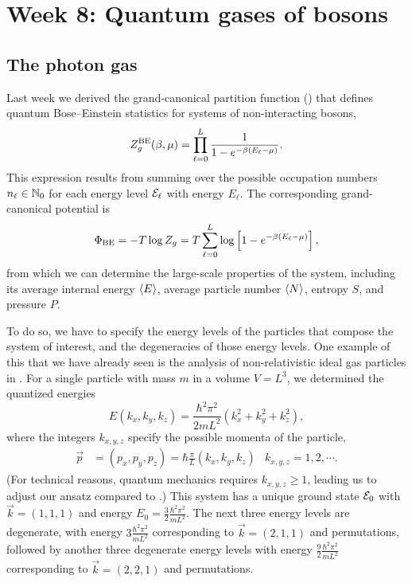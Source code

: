 \renewcommand{\thisweek}{MATH327 Week 8}
\renewcommand{\moddate}{Last modified 17 Apr.~2021}
\setcounter{section}{8}
\setcounter{subsection}{0}
{}
\section*{Week 8: Quantum gases of bosons}
\subsection{The photon gas}
Last week we derived the grand-canonical partition function () that defines quantum Bose--Einstein statistics for systems of non-interacting bosons,
\begin{equation*}
  Z_g^{\text{BE}}(\beta, \mu) = \prod_{\ell = 0}^L \frac{1}{1 - e^{-\beta (E_{\ell} - \mu)}}.
\end{equation*}
This expression results from summing over the possible occupation numbers $n_{\ell} \in \mathbb N_0$ for each energy level $\mathcal E_{\ell}$ with energy $E_{\ell}$.
The corresponding grand-canonical potential is
\begin{equation*}
  \Phi_{\text{BE}} = -T \log Z_g = T \sum_{\ell = 0}^L \log\left[1 - e^{-\beta (E_{\ell} - \mu)}\right],
\end{equation*}
from which we can determine the large-scale properties of the system, including its average internal energy $\left\langle E \right\rangle$, average particle number $\left\langle N \right\rangle$, entropy $S$, and pressure $P$.

To do so, we have to specify the energy levels of the particles that compose the system of interest, and the degeneracies of those energy levels.
One example of this that we have already seen is the analysis of non-relativistic ideal gas particles in .
For a single particle with mass $m$ in a volume $V = L^3$, we determined the quantized energies
\begin{equation}
  \label{eq:nonrel_energy}
  E(k_x, k_y, k_z) = \frac{\hbar^2 \pi^2}{2mL^2}\left(k_x^2 + k_y^2 + k_z^2\right),
\end{equation}
where the integers $k_{x, y, z}$ specify the possible momenta of the particle,
\begin{align*}
  \vec p & = (p_x, p_y, p_z) = \hbar \frac{\pi}{L} (k_x, k_y, k_z) &
  k_{x, y, z} = 1, 2, \cdots.
\end{align*}
(For technical reasons, quantum mechanics requires $k_{x, y, z} \geq 1$, leading us to adjust our ansatz compared to .)
This system has a unique ground state $\mathcal E_0$ with $\vec k = (1, 1, 1)$ and energy $E_0 = \frac{3}{2} \frac{\hbar^2 \pi^2}{mL^2}$.
The next three energy levels are degenerate, with energy $3 \frac{\hbar^2 \pi^2}{mL^2}$ corresponding to $\vec k = (2, 1, 1)$ and permutations, followed by another three degenerate energy levels with energy $\frac{9}{2} \frac{\hbar^2 \pi^2}{mL^2}$ corresponding to $\vec k = (2, 2, 1)$ and permutations.


